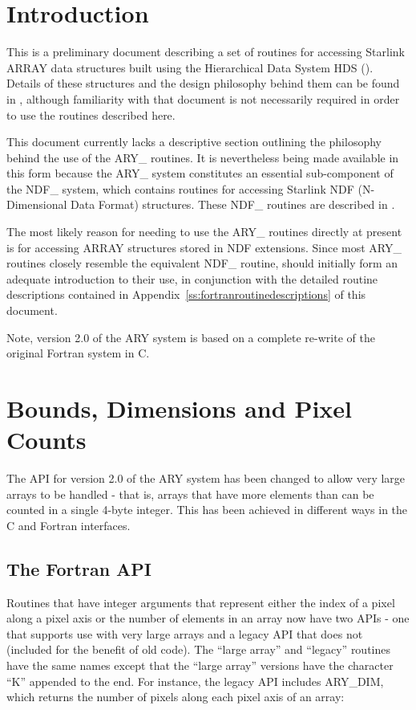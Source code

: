 \documentclass[twoside,11pt,nolof]{starlink}
\begin{document}
\scfrontmatter


\section{Introduction}
\label{introduction}

This is a preliminary document describing a set of routines for accessing
Starlink ARRAY data structures built using the Hierarchical Data System HDS
().  Details of these structures and the design
philosophy behind them can be found in , although
familiarity with that document is not necessarily required in order to
use the routines described here.

This document currently lacks a descriptive section outlining the
philosophy behind the use of the ARY\_ routines.  It is nevertheless
being made available in this form because the ARY\_ system constitutes
an essential sub-component of the NDF\_ system, which contains routines
for accessing Starlink NDF (N-Dimensional Data Format) structures.
These NDF\_ routines are described in .

The most likely reason for needing to use the ARY\_ routines directly at
present is for accessing ARRAY structures stored in NDF extensions.
Since most ARY\_ routines closely resemble the equivalent NDF\_ routine,
 should initially form an adequate introduction to
their use, in conjunction with the detailed routine descriptions contained in
Appendix~\ref{ss:fortranroutinedescriptions} of this document.

Note, version 2.0 of the ARY system is based on a complete re-write of
the original Fortran system in C.

\section{Bounds, Dimensions and Pixel Counts}
\label{bounds_dimensions_and_pixel_counts}
The API for version 2.0 of the ARY system has been changed to allow very
large arrays to be handled - that is, arrays that have more elements than can
be counted in a single 4-byte integer. This has been achieved in
different ways  in the C and Fortran interfaces.

\subsection{The Fortran API}
Routines that have integer arguments that represent either the index of a
pixel along a pixel axis or the number of elements in an array now have
two APIs - one that supports use with very large arrays and a legacy API
that does not (included for the benefit of old code). The ``large array''
and ``legacy'' routines have the same names except that the ``large array''
versions have the character ``K'' appended to the end. For instance, the
legacy API includes ARY\_DIM, which returns the number of pixels along
each pixel axis of an array:
\end{document}
